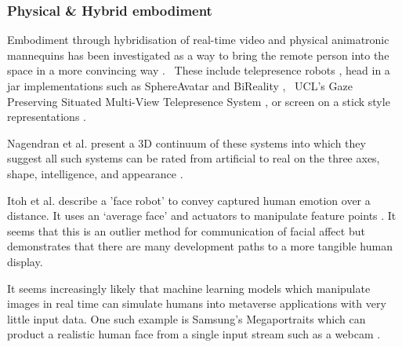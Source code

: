 \subsubsection{Physical \& Hybrid embodiment}
Embodiment through hybridisation of real-time video and physical animatronic mannequins has been investigated as a way to bring the remote person into the space in a more convincing way \cite{Lincoln2009, Lincoln2010, Raskar2001}. \ These include telepresence robots \cite{Lee2011, Sakamoto2007, Tsui2011}, head in a jar implementations such as SphereAvatar \cite{Oyekoya2012, Pan2014, Pan2012} and BiReality \cite{Jouppi2004}, \ UCL's Gaze Preserving Situated Multi-View Telepresence System \cite{Pan2014}, or screen on a stick style representations \cite{Kristoffersson2013}.\par  
Nagendran et al. present a 3D continuum of these systems into which they suggest all such systems can be rated from artificial to real on the three axes, shape, intelligence, and appearance \cite{Nagendran2012}.\par
                    Itoh et al. describe a 'face robot' to convey captured human emotion over a distance. It uses an `average face' and actuators to manipulate feature points \cite{Itoh2005}. It seems that this is an outlier method for communication of facial affect but demonstrates that there are many development paths to a more tangible human display.\par
                    It seems increasingly likely that machine learning models which manipulate images in real time can simulate humans into metaverse applications with very little input data. One such example is Samsung's Megaportraits which can product a realistic human face from a single input stream such as a webcam \cite{Drobyshev22MP}. 
